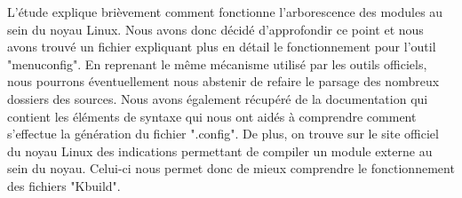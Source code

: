 \documentclass[16pts]{report}
\begin{document}
L'étude \cite{Waterloo:Etude} explique brièvement comment fonctionne
l'arborescence des modules au sein du noyau Linux. Nous avons donc décidé
d'approfondir ce point et nous avons trouvé un fichier
\cite{Existant:Kconfig:frontends} expliquant plus en détail le fonctionnement
pour l'outil "menuconfig". En reprenant le même mécanisme utilisé par les outils
officiels, nous pourrons éventuellement nous abstenir de refaire le parsage des
nombreux dossiers des sources. Nous avons également récupéré de la documentation
\cite{Existant:Kconfig:vueDensemble} \cite{Existant:Kconfig:langage} qui
contient les éléments de syntaxe qui nous ont aidés à comprendre comment
s'effectue la génération du fichier ".config". De plus, on trouve sur le site
officiel du noyau Linux des indications \cite{Existant:Kconfig:modules}
permettant de compiler un module externe au sein du noyau. Celui-ci nous permet
donc de mieux comprendre le fonctionnement des fichiers "Kbuild".

\end{document}
